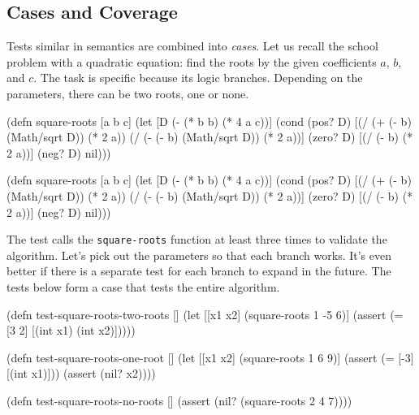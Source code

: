 \subsection{Cases and Coverage}


Tests similar in semantics are combined into \emph{cases}. Let us recall the school problem with a quadratic equation: find the roots by the given coefficients $a$, $b$, and $c$. The task is specific because its logic branches. Depending on the parameters, there can be two roots, one or none.


\ifx\DEVICETYPE\MOBILE

\begin{english}
  \begin{clojure}
(defn square-roots [a b c]
  (let [D (- (* b b) (* 4 a c))]
    (cond
      (pos? D)
      [(/ (+ (- b) (Math/sqrt D))
          (* 2 a))
       (/ (- (- b) (Math/sqrt D))
          (* 2 a))]
      (zero? D) [(/ (- b) (* 2 a))]
      (neg? D) nil)))
  \end{clojure}
\end{english}

\else

\begin{english}
  \begin{clojure}
(defn square-roots [a b c]
  (let [D (- (* b b) (* 4 a c))]
    (cond
      (pos? D) [(/ (+ (- b) (Math/sqrt D)) (* 2 a))
                (/ (- (- b) (Math/sqrt D)) (* 2 a))]
      (zero? D) [(/ (- b) (* 2 a))]
      (neg? D) nil)))
  \end{clojure}
\end{english}

\fi


The test calls the \verb|square-roots| function at least three times to validate the algorithm. Let's pick out the parameters so that each branch works. It's even better if there is a separate test for each branch to expand in the future. The tests below form a case that tests the entire algorithm.

\ifx\DEVICETYPE\MOBILE

\begin{english}
  \begin{clojure}
(defn test-square-roots-two-roots []
  (let [[x1 x2] (square-roots 1 -5 6)]
    (assert
      (= [3 2]
         [(int x1) (int x2)]))))

(defn test-square-roots-one-root []
  (let [[x1 x2] (square-roots 1 6 9)]
    (assert (= [-3] [(int x1)]))
    (assert (nil? x2))))

(defn test-square-roots-no-roots []
  (assert (nil? (square-roots 2 4 7))))
  \end{clojure}
\end{english}


